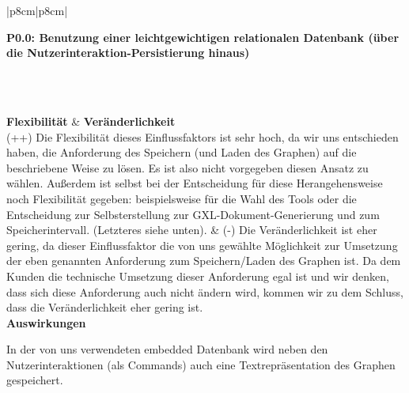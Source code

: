 \documentclass[enabledeprecatedfontcommands,fontsize=11pt,paper=a4,twoside]{scrartcl}
\newcounter{one}
\newcounter{two}[one]
\newcommand{\tone}{0\theone}
\newcommand{\two}{\stepcounter{two}0\thetwo}
\begin{document}
\begin{tabular} {|p{8cm}|p{8cm}|}
	\hline
	 {\parbox{16cm}{\textbf{\hypertarget{e}{P\tone.\two}: Benutzung einer leichtgewichtigen relationalen Datenbank (über die Nutzerinteraktion-Persistierung hinaus)}} } \\ \hline\hline 
	\rule{0pt}{11ex}\\ [3ex] \hline
	\textbf{Flexibilität}  & \textbf{Veränderlichkeit} \\
	(++) Die Flexibilität dieses Einflussfaktors ist sehr hoch, da wir uns entschieden haben, die Anforderung des Speichern (und Laden des Graphen) auf die beschriebene Weise zu lösen. Es ist also nicht vorgegeben diesen Ansatz zu wählen. Außerdem ist selbst bei der Entscheidung für diese Herangehensweise noch Flexibilität gegeben: beispielsweise für die Wahl des Tools oder die Entscheidung zur Selbsterstellung zur GXL-Dokument-Generierung und zum Speicherintervall. (Letzteres siehe unten). & 
	(-) Die Veränderlichkeit ist eher gering, da dieser Einflussfaktor die von uns gewählte Möglichkeit zur Umsetzung der eben genannten Anforderung zum Speichern/Laden des Graphen ist. Da dem Kunden die technische Umsetzung dieser Anforderung egal ist und wir denken, dass sich diese Anforderung auch nicht ändern wird, kommen wir zu dem Schluss, dass die Veränderlichkeit eher gering ist.\\
	\hline
	 {\textbf{Auswirkungen}} \\
	 {\parbox{16cm}{In der von uns verwendeten embedded Datenbank wird neben den Nutzerinteraktionen (als Commands) auch eine Textrepräsentation des Graphen gespeichert.} }\\ \hline
\end{tabular}
\\ \\ \\ \\%
\end{document}
